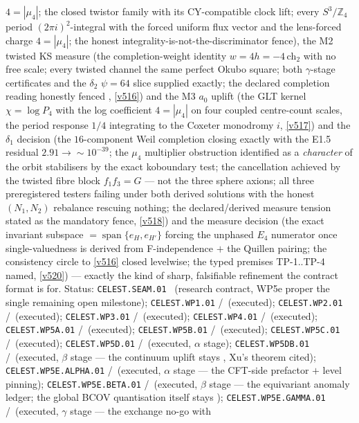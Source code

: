 \documentclass[11pt,a4paper]{article}
\newcommand{\Z}{\mathbb Z}
\begin{document}
$4=|\mu_4|$; the closed twistor family with its CY-compatible clock lift; every $S^3/\Z_4$
period $(2\pi i)^2$-integral with the forced uniform flux vector and the lens-forced charge
$4=|\mu_4|$; the honest integrality-is-not-the-discriminator fence), the M2 twisted KS measure
(the completion-weight identity $w=4h=-4\,\mathrm{ch}_2$ with no free scale; every twisted
channel the same perfect Okubo square; both $\gamma$-stage certificates and the $\delta_2$
$\psi=64$ slice supplied exactly; the declared completion reading honestly fenced \mC,
\vref{v516}) and the M3 $a_0$ uplift (the GLT kernel $\chi=\log P_4$ with the log coefficient
$4=|\mu_4|$ on four coupled centre-count scales, the period response $1/4$ integrating to the
Coxeter monodromy $i$, \vref{v517}) and the $\delta_1$ decision (the $16$-component Weil
completion closing exactly with the E1.5 residual $2.91\to\sim10^{-39}$; the $\mu_4$
multiplier obstruction identified as a \emph{character} of the orbit stabilisers by the exact
koboundary test; the cancellation achieved by the twisted fibre block $f_1f_3=G$ --- not the
three sphere axions; all three preregistered testers failing under both derived solutions with
the honest $(N_1,N_2)$ rebalance rescuing nothing; the declared/derived measure tension stated
as the mandatory fence, \vref{v518}) and the measure decision (the exact invariant subspace
$=\operatorname{span}\{e_H,e_{H'}\}$ forcing the unphased $E_4$ numerator once
single-valuedness is derived from F-independence $+$ the Quillen pairing; the consistency
circle to \vref{v516} closed levelwise; the typed premises TP-1..TP-4 named,
\vref{v520}) --- exactly the kind of sharp,
falsifiable refinement the contract format is for. Status: \texttt{CELEST.SEAM.01} \mO\ (research
contract, WP5e proper the single remaining open milestone); \texttt{CELEST.WP1.01} \mE/\mC\ (executed);
\texttt{CELEST.WP2.01} \mE/\mC\ (executed); \texttt{CELEST.WP3.01} \mE/\mC\ (executed);
\texttt{CELEST.WP4.01} \mE/\mC\ (executed); \texttt{CELEST.WP5A.01} \mE/\mC\ (executed);
\texttt{CELEST.WP5B.01} \mE/\mC\ (executed); \texttt{CELEST.WP5C.01} \mE/\mC\ (executed);
\texttt{CELEST.WP5D.01} \mE/\mC\ (executed, $\alpha$ stage);
\texttt{CELEST.WP5DB.01} \mE/\mC\ (executed, $\beta$ stage --- the continuum uplift stays \mO,
Xu's theorem cited);
\texttt{CELEST.WP5E.ALPHA.01} \mE/\mC\ (executed, $\alpha$ stage --- the CFT-side prefactor $+$
level pinning);
\texttt{CELEST.WP5E.BETA.01} \mE/\mC\ (executed, $\beta$ stage --- the equivariant anomaly ledger;
the global BCOV quantisation itself stays \mO);
\texttt{CELEST.WP5E.GAMMA.01} \mE/\mC\ (executed, $\gamma$ stage --- the exchange no-go with
\end{document}

